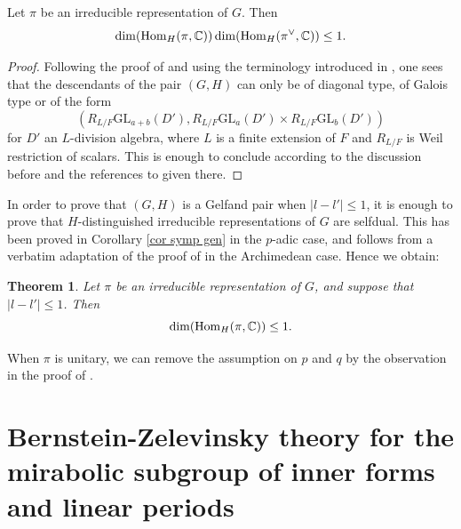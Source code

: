 \documentclass[11pt,letterpaper]{amsart}
\newcommand{\GL}{{\mathrm {GL}}} \newcommand{\PGL}{{\mathrm {PGL}}}
\newcommand{\Hom}{\mathrm{Hom}}
\theoremstyle{plain}
\newtheorem{thm}{Theorem}[section] \newtheorem{cor}[thm]{Corollary}
\numberwithin{equation}{section}
\begin{document}
\begin{prop}
Let $\pi$ be an irreducible representation of $G$. Then \[\dim(\Hom_H(\pi,\BC))\dim(\Hom_H(\pi^\vee,\BC))\leq 1.\]
\end{prop}
\begin{proof}
Following the proof of \cite[Proposition 4.1]{Zlinear} and using the terminology introduced in \cite{BM}, one sees that the descendants of the pair $(G,H)$ can only be of diagonal type, of Galois type or of the form \[(R_{L /F}\GL_{a+b}(D' ), R_{L /F}\GL_a(D' )\times R_{L /F}\GL_b(D' ))\] for $D'$ an $L$-division algebra, where $L$ is a finite extension of $F$ and $R_{L /F}$ is Weil restriction of scalars. This is enough to conclude according to the discussion before \cite[Proposition 4.3]{Zlinear} and the references to \cite{Aizenbud-Gourevitch} given there.
\end{proof}

In order to prove that $(G,H)$ is a Gelfand pair when $|l-l'|\leq 1$, it is enough to prove that $H$-distinguished irreducible representations of $G$ are selfdual. This has been proved in Corollary \ref{cor symp gen} in the $p$-adic case, and follows from a verbatim adaptation of the proof of \cite[Theorem 6.7]{BM} in the Archimedean case. Hence we obtain:

\begin{thm}\label{thm mult 1 Arch}
Let $\pi$ be an irreducible representation of $G$, and suppose that $|l-l'|\leq 1$. Then \[\dim(\Hom_{H}(\pi,\BC))\leq 1.\]
\end{thm}

When $\pi$ is unitary, we can remove the assumption on $p$ and $q$ by the observation in the proof of \cite[Corollary 4.4]{Zlinear}.

\section{Bernstein-Zelevinsky theory for the mirabolic subgroup of inner forms and linear periods}\label{app BZ der}
\end{document}
